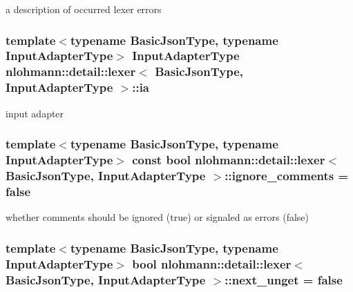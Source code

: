 a description of occurred lexer errors 

\subsubsection[{\texorpdfstring{ia}{ia}}]{\setlength{\rightskip}{0pt plus 5cm}template$<$typename Basic\+Json\+Type, typename Input\+Adapter\+Type$>$ Input\+Adapter\+Type {\bf nlohmann\+::detail\+::lexer}$<$ Basic\+Json\+Type, Input\+Adapter\+Type $>$\+::ia\hspace{0.3cm}{\ttfamily [private]}}\hypertarget{classnlohmann_1_1detail_1_1lexer_a526d001dd91ec55b8032ba98466765c0}{}\label{classnlohmann_1_1detail_1_1lexer_a526d001dd91ec55b8032ba98466765c0}


input adapter 

\subsubsection[{\texorpdfstring{ignore\+\_\+comments}{ignore_comments}}]{\setlength{\rightskip}{0pt plus 5cm}template$<$typename Basic\+Json\+Type, typename Input\+Adapter\+Type$>$ const bool {\bf nlohmann\+::detail\+::lexer}$<$ Basic\+Json\+Type, Input\+Adapter\+Type $>$\+::ignore\+\_\+comments = false\hspace{0.3cm}{\ttfamily [private]}}\hypertarget{classnlohmann_1_1detail_1_1lexer_a11528814930243028ac5b8901f4a17d7}{}\label{classnlohmann_1_1detail_1_1lexer_a11528814930243028ac5b8901f4a17d7}


whether comments should be ignored (true) or signaled as errors (false) 

\subsubsection[{\texorpdfstring{next\+\_\+unget}{next_unget}}]{\setlength{\rightskip}{0pt plus 5cm}template$<$typename Basic\+Json\+Type, typename Input\+Adapter\+Type$>$ bool {\bf nlohmann\+::detail\+::lexer}$<$ Basic\+Json\+Type, Input\+Adapter\+Type $>$\+::next\+\_\+unget = false\hspace{0.3cm}{\ttfamily [private]}}\hypertarget{classnlohmann_1_1detail_1_1lexer_a40b108a0e45a7253f6ad85fbdaa6a262}{}\label{classnlohmann_1_1detail_1_1lexer_a40b108a0e45a7253f6ad85fbdaa6a262}


